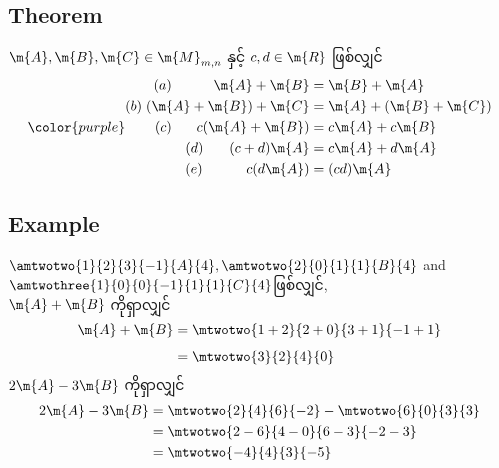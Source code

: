 \subsection{Theorem}
$\m{A},\m{B},\m{C}\in\m{M}_{m,n}$ နှင့် $c,d\in\m{R}$ ဖြစ်လျှင်
\begin{equation}
    {\color{purple} \begin{split}
        (a)\hspace{10.5mm}\m{A}+\m{B}&=\m{B}+\m{A} \\
        (b)\hspace{1mm}(\m{A}+\m{B})+\m{C}&=\m{A}+(\m{B}+\m{C}) \\
        (c)\hspace{6.25mm}c(\m{A}+\m{B})&= c\m{A}+c\m{B} \\
        (d)\hspace{6.5mm}(c+d)\m{A}&=c\m{A}+d\m{A} \\
        (e)\hspace{11mm}c(d\m{A})&=(cd)\m{A}
    \end{split}}
\end{equation}
\subsection{Example}
$\amtwotwo{1}{2}{3}{-1}{A}{4},\amtwotwo{2}{0}{1}{1}{B}{4}$ and $\amtwothree{1}{0}{0}{-1}{1}{1}{C}{4}$ဖြစ်လျှင်, \\[1ex]
$\m{A}+\m{B}$ ကိုရှာလျှင်
\[
    \begin{split}
        \m{A}+\m{B}&=\mtwotwo{1+2}{2+0}{3+1}{-1+1} \\[1ex]
        &=\mtwotwo{3}{2}{4}{0}
    \end{split}
\]
$2\m{A}-3\m{B}$ ကိုရှာလျှင်
\[
    \begin{split}
        2\m{A}-3\m{B}&=\mtwotwo{2}{4}{6}{-2}-\mtwotwo{6}{0}{3}{3} \\
        &= \mtwotwo{2-6}{4-0}{6-3}{-2-3} \\
        &= \mtwotwo{-4}{4}{3}{-5}
    \end{split}
\]